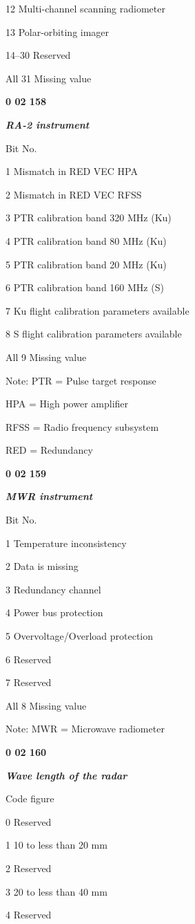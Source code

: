 12 Multi-channel scanning radiometer

13 Polar-orbiting imager

14--30 Reserved

All 31 Missing value

\textbf{0 02 158}

\emph{\textbf{RA-2 instrument}}

Bit No.

1 Mismatch in RED VEC HPA

2 Mismatch in RED VEC RFSS

3 PTR calibration band 320 MHz (Ku)

4 PTR calibration band 80 MHz (Ku)

5 PTR calibration band 20 MHz (Ku)

6 PTR calibration band 160 MHz (S)

7 Ku flight calibration parameters available

8 S flight calibration parameters available

All 9 Missing value

Note: PTR = Pulse target response

HPA = High power amplifier

RFSS = Radio frequency subsystem

RED = Redundancy

\textbf{0 02 159}

\emph{\textbf{MWR instrument}}

Bit No.

1 Temperature inconsistency

2 Data is missing

3 Redundancy channel

4 Power bus protection

5 Overvoltage/Overload protection

6 Reserved

7 Reserved

All 8 Missing value

Note: MWR = Microwave radiometer

\textbf{0 02 160}

\emph{\textbf{Wave length of the radar}}

Code figure

0 Reserved

1 10 to less than 20 mm

2 Reserved

3 20 to less than 40 mm

4 Reserved

